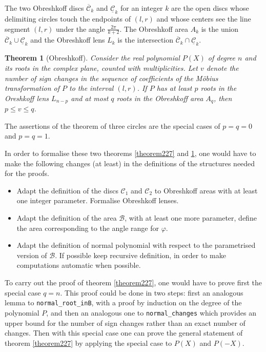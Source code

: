 \documentclass[11pt, a4paper]{article}
\newtheorem{mtheorem}{Theorem}[section]
\newcommand{\ol}{\overline}
\newcommand{\ul}{\underline}
\newcommand{\ssb}{{\mathcal B}}
\newcommand{\ssc}{{\mathcal C}}
\begin{document}
The two Obreshkoff discs $\ol{\ssc}_k$ and $\ul{\ssc}_k$ for an integer $k$ are the open discs whose delimiting circles touch the endpoints of $(l,r)$ and whose centers see the line segment $(l,r)$ under the angle $\frac{2\pi}{k+2}$.
The Obreshkoff area $A_k$ is the union $\ol{\ssc}_k \cup \ul{\ssc}_k$ and the Obreshkoff lens $L_k$ is the intersection $\ol{\ssc}_k \cap \ul{\ssc}_k$.

\begin{mtheorem}[Obreshkoff]
Consider the real polynomial $P(X)$ of degree $n$ and its roots in the complex plane, counted with multiplicities. Let $v$ denote the number of sign changes in the sequence of coefficients of the M\"obius transformation of $P$ to the interval $(l,r)$.
If $P$ has at least $p$ roots in the Oreshkoff lens $L_{n-p}$ and at most $q$ roots in the Obreshkoff area $A_q$, then $p \leq v \leq q$.

\label{theorem232}
\end{mtheorem}
The assertions of the theorem of three circles are the special cases of $p=q=0$ and $p=q=1$.

In order to formalise these two theorems \ref{theorem227} and \ref{theorem232}, one would have to make the following changes (at least) in the definitions of the structures needed for the proofs.
\begin{itemize}
 \item Adapt the definition of the discs $\ssc_1$ and $\ssc_2$ to Obreshkoff areas with at least one integer parameter. Formalise Obreshkoff lenses.
 \item Adapt the definition of the area $\ssb$, with at least one more parameter, define the area corresponding to the angle range for $\varphi$.
 \item Adapt the definition of normal polynomial with respect to the pa\-ra\-met\-rised version of $\ssb$. If possible keep recursive definition, in order to make computations automatic when possible.
\end{itemize}

To carry out the proof of theorem \ref{theorem227}, one would have to prove first the special case $q=n$. This proof could be done in two steps: first an analogous lemma to \lstinline!normal_root_inB!, with a proof by induction on the degree of the polynomial $P$, and then an analogous one to \lstinline!normal_changes! which provides an upper bound for the number of sign changes rather than an exact number of changes. Then with this special case one can prove the general statement of theorem \ref{theorem227} by applying the special case to $P(X)$ and $P(-X)$.
\end{document}
